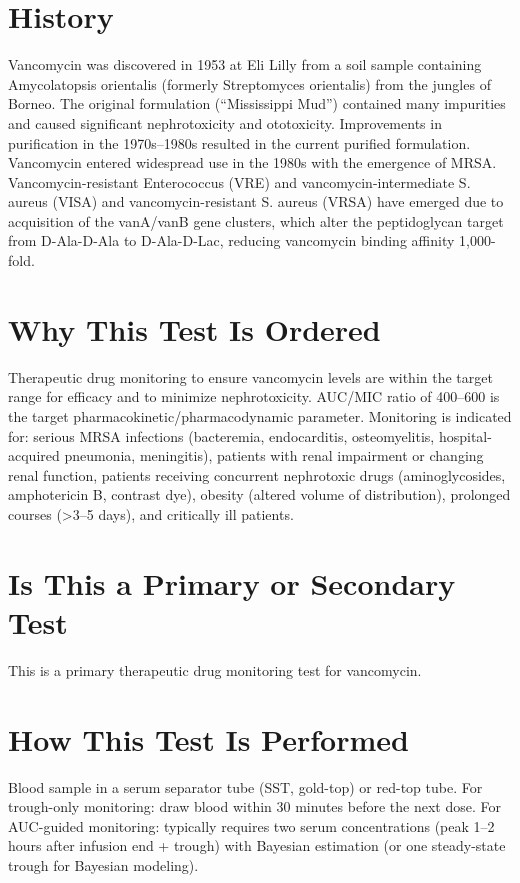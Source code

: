 \section*{History}
Vancomycin was discovered in 1953 at Eli Lilly from a soil sample containing Amycolatopsis orientalis (formerly Streptomyces orientalis) from the jungles of Borneo. The original formulation (``Mississippi Mud'') contained many impurities and caused significant nephrotoxicity and ototoxicity. Improvements in purification in the 1970s--1980s resulted in the current purified formulation. Vancomycin entered widespread use in the 1980s with the emergence of MRSA. Vancomycin-resistant Enterococcus (VRE) and vancomycin-intermediate S. aureus (VISA) and vancomycin-resistant S. aureus (VRSA) have emerged due to acquisition of the vanA/vanB gene clusters, which alter the peptidoglycan target from D-Ala-D-Ala to D-Ala-D-Lac, reducing vancomycin binding affinity 1,000-fold.

\section*{Why This Test Is Ordered}
Therapeutic drug monitoring to ensure vancomycin levels are within the target range for efficacy and to minimize nephrotoxicity. AUC/MIC ratio of 400--600 is the target pharmacokinetic/pharmacodynamic parameter. Monitoring is indicated for: serious MRSA infections (bacteremia, endocarditis, osteomyelitis, hospital-acquired pneumonia, meningitis), patients with renal impairment or changing renal function, patients receiving concurrent nephrotoxic drugs (aminoglycosides, amphotericin B, contrast dye), obesity (altered volume of distribution), prolonged courses (>3--5 days), and critically ill patients.

\section*{Is This a Primary or Secondary Test}
This is a primary therapeutic drug monitoring test for vancomycin.

\section*{How This Test Is Performed}
Blood sample in a serum separator tube (SST, gold-top) or red-top tube. For trough-only monitoring: draw blood within 30 minutes before the next dose. For AUC-guided monitoring: typically requires two serum concentrations (peak 1--2 hours after infusion end + trough) with Bayesian estimation (or one steady-state trough for Bayesian modeling).

